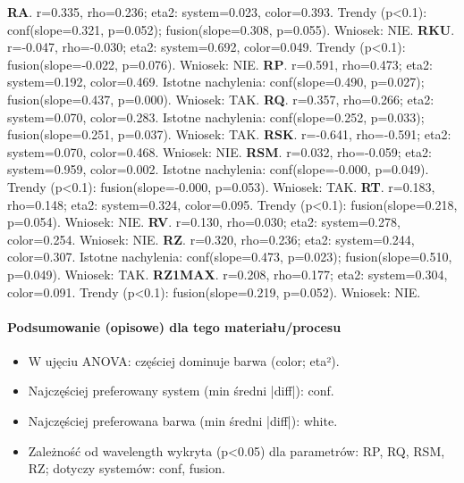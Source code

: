 \documentclass[
  10pt,
]{article}
\begin{document}
\textbf{RA}. r=0.335, rho=0.236; eta2: system=0.023, color=0.393. Trendy
(p\textless0.1): conf(slope=0.321, p=0.052); fusion(slope=0.308,
p=0.055). Wniosek: NIE. \textbf{RKU}. r=-0.047, rho=-0.030; eta2:
system=0.692, color=0.049. Trendy (p\textless0.1): fusion(slope=-0.022,
p=0.076). Wniosek: NIE. \textbf{RP}. r=0.591, rho=0.473; eta2:
system=0.192, color=0.469. Istotne nachylenia: conf(slope=0.490,
p=0.027); fusion(slope=0.437, p=0.000). Wniosek: TAK. \textbf{RQ}.
r=0.357, rho=0.266; eta2: system=0.070, color=0.283. Istotne nachylenia:
conf(slope=0.252, p=0.033); fusion(slope=0.251, p=0.037). Wniosek: TAK.
\textbf{RSK}. r=-0.641, rho=-0.591; eta2: system=0.070, color=0.468.
Wniosek: NIE. \textbf{RSM}. r=0.032, rho=-0.059; eta2: system=0.959,
color=0.002. Istotne nachylenia: conf(slope=-0.000, p=0.049). Trendy
(p\textless0.1): fusion(slope=-0.000, p=0.053). Wniosek: TAK.
\textbf{RT}. r=0.183, rho=0.148; eta2: system=0.324, color=0.095. Trendy
(p\textless0.1): fusion(slope=0.218, p=0.054). Wniosek: NIE.
\textbf{RV}. r=0.130, rho=0.030; eta2: system=0.278, color=0.254.
Wniosek: NIE. \textbf{RZ}. r=0.320, rho=0.236; eta2: system=0.244,
color=0.307. Istotne nachylenia: conf(slope=0.473, p=0.023);
fusion(slope=0.510, p=0.049). Wniosek: TAK. \textbf{RZ1MAX}. r=0.208,
rho=0.177; eta2: system=0.304, color=0.091. Trendy (p\textless0.1):
fusion(slope=0.219, p=0.052). Wniosek: NIE.

\paragraph{Podsumowanie (opisowe) dla tego materiału/procesu}
\begin{itemize}
\item W ujęciu ANOVA: częściej dominuje barwa (color; eta²).
\item Najczęściej preferowany system (min średni |diff|): conf.
\item Najczęściej preferowana barwa (min średni |diff|): white.
\item Zależność od wavelength wykryta (p<0.05) dla parametrów: RP, RQ, RSM, RZ; dotyczy systemów: conf, fusion.
\end{itemize}
\end{document}
